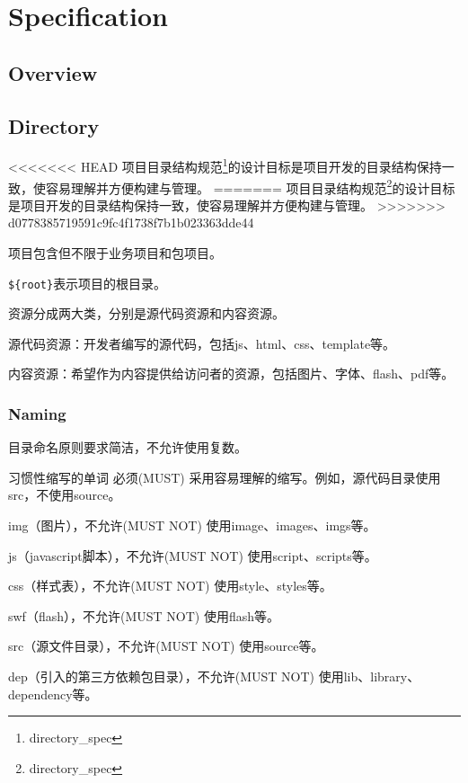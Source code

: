 \part{Specification}



\chapter{Overview}




\chapter{Directory}


<<<<<<< HEAD
项目目录结构规范\footnote{directory\_spec}的设计目标是项目开发的目录结构保持一致，使容易理解并方便构建与管理。
=======
项目目录结构规范\footnote{directory\_spec}的设计目标是项目开发的目录结构保持一致，使容易理解并方便构建与管理。
>>>>>>> d0778385719591c9fc4f1738f7b1b023363dde44


\begin{compactitem}
\item 项目包含但不限于业务项目和包项目。
\item \texttt{\$\{root\}}表示项目的根目录。
\end{compactitem}


资源分成两大类，分别是源代码资源和内容资源。

\begin{compactenum}
\item 源代码资源：开发者编写的源代码，包括js、html、css、template等。
\item 内容资源：希望作为内容提供给访问者的资源，包括图片、字体、flash、pdf等。
\end{compactenum}

\section{Naming}


目录命名原则要求简洁，不允许使用复数。

习惯性缩写的单词 必须(MUST) 采用容易理解的缩写。例如，源代码目录使用src，不使用source。

\begin{compactitem}
\item img（图片），不允许(MUST NOT) 使用image、images、imgs等。
\item js（javascript脚本），不允许(MUST NOT) 使用script、scripts等。
\item css（样式表），不允许(MUST NOT) 使用style、styles等。
\item swf（flash），不允许(MUST NOT) 使用flash等。
\item src（源文件目录），不允许(MUST NOT) 使用source等。
\item dep（引入的第三方依赖包目录），不允许(MUST NOT) 使用lib、library、dependency等。
\end{compactitem}

